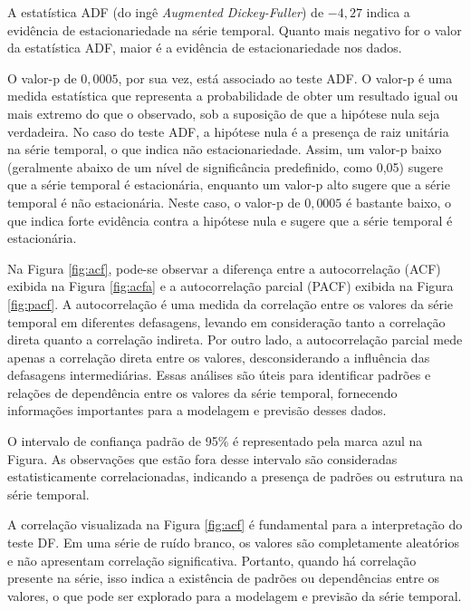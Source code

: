 A estatística ADF (do ingê \textit{Augmented Dickey-Fuller}) de $-4,27$ indica a evidência de estacionariedade na série temporal. Quanto mais negativo for o valor da estatística ADF, maior é a evidência de estacionariedade nos dados.

O valor-p de $0,0005$, por sua vez, está associado ao teste ADF. O valor-p é uma medida estatística que representa a probabilidade de obter um resultado igual ou mais extremo do que o observado, sob a suposição de que a hipótese nula seja verdadeira. No caso do teste ADF, a hipótese nula é a presença de raiz unitária na série temporal, o que indica não estacionariedade. Assim, um valor-p baixo (geralmente abaixo de um nível de significância predefinido, como 0,05) sugere que a série temporal é estacionária, enquanto um valor-p alto sugere que a série temporal é não estacionária. Neste caso, o valor-p de $0,0005$ é bastante baixo, o que indica forte evidência contra a hipótese nula e sugere que a série temporal é estacionária.

Na Figura \ref{fig:acf}, pode-se observar a diferença entre a autocorrelação (ACF) exibida na Figura \ref{fig:acfa} e a autocorrelação parcial (PACF) exibida na Figura \ref{fig:pacf}. A autocorrelação é uma medida da correlação entre os valores da série temporal em diferentes defasagens, levando em consideração tanto a correlação direta quanto a correlação indireta. Por outro lado, a autocorrelação parcial mede apenas a correlação direta entre os valores, desconsiderando a influência das defasagens intermediárias. Essas análises são úteis para identificar padrões e relações de dependência entre os valores da série temporal, fornecendo informações importantes para a modelagem e previsão desses dados.

O intervalo de confiança padrão de 95\% é representado pela marca azul na Figura. As observações que estão fora desse intervalo são consideradas estatisticamente correlacionadas, indicando a presença de padrões ou estrutura na série temporal.

A correlação visualizada na Figura \ref{fig:acf} é fundamental para a interpretação do teste DF. Em uma série de ruído branco, os valores são completamente aleatórios e não apresentam correlação significativa. Portanto, quando há correlação presente na série, isso indica a existência de padrões ou dependências entre os valores, o que pode ser explorado para a modelagem e previsão da série temporal.

